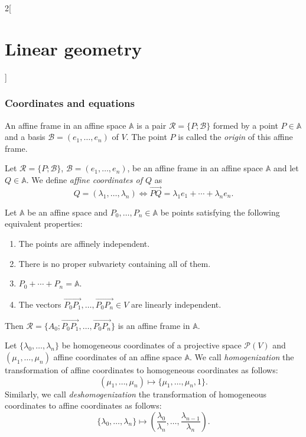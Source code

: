 \documentclass[class=article,10pt,crop=false]{standalone}
\begin{document}
\begin{multicols}{2}[\section{Linear geometry}]
\subsubsection{Coordinates and equations}
\begin{definition}
An affine frame in an affine space $\mathbb{A}$ is a pair $\mathcal{R}=\{P;\mathcal{B}\}$ formed by a point $P\in\mathbb{A}$ and a basis $\mathcal{B}=(e_1,\ldots,e_n)$ of $V$. The point $P$ is called the \textit{origin} of this affine frame.
\end{definition}
\begin{definition}
Let $\mathcal{R}=\{P;\mathcal{B}\}$, $\mathcal{B}=(e_1,\ldots,e_n)$, be an affine frame in an affine space $\mathbb{A}$ and let $Q\in\mathbb{A}$. We define \textit{affine coordinates of $Q$} as $$Q=(\lambda_1,\ldots,\lambda_n)\iff\overrightarrow{PQ}=\lambda_1e_1+\cdots+\lambda_ne_n.$$
\end{definition}
\begin{prop}
Let $\mathbb{A}$ be an affine space and $P_0,\ldots,P_n\in\mathbb{A}$ be points satisfying the following equivalent properties:
\begin{enumerate}
    \item The points are affinely independent.
    \item There is no proper subvariety containing all of them.
    \item $P_0+\cdots+P_n=\mathbb{A}$.
    \item The vectors $\overrightarrow{P_0P_1},\ldots,\overrightarrow{P_0P_n}\in V$ are linearly independent.
\end{enumerate}
Then $\mathcal{R}=\{A_0;\overrightarrow{P_0P_1},\ldots,\overrightarrow{P_0P_n}\}$ is an affine frame in $\mathbb{A}$.
\end{prop}
\begin{definition}
Let $\{\lambda_0,\ldots,\lambda_n\}$ be homogeneous coordinates of a projective space $\mathcal{P}(V)$ and $(\mu_1,\ldots,\mu_n)$ affine coordinates of an affine space $\mathbb{A}$. We call \textit{homogenization} the transformation of affine coordinates to homogeneous coordinates as follows: $$(\mu_1,\ldots,\mu_n)\mapsto\{\mu_1,\ldots,\mu_n,1\}.$$ Similarly, we call \textit{deshomogenization} the transformation of homogeneous coordinates to affine coordinates as follows: $$\{\lambda_0,\ldots,\lambda_n\}\mapsto\left(\frac{\lambda_0}{\lambda_n},\ldots,\frac{\lambda_{n-1}}{\lambda_n}\right).$$
\end{definition}
\begin{definition}

\end{definition}
\end{multicols}
\end{document}
